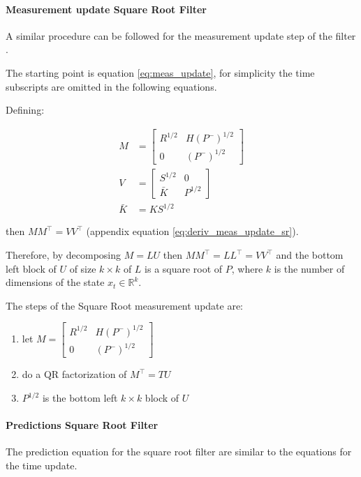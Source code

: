\documentclass{article}
\begin{document}
\paragraph{Measurement update Square Root Filter} A similar procedure can be followed for the measurement update step of the filter \cite{dan_simon_optimal_2006}.

The starting point is equation \ref{eq:meas_update}, for simplicity the time subscripts are omitted in the following equations.

Defining:

\begin{align*}
    M &= \begin{bmatrix} R^{1/2} & H(P^-)^{1/2} \\ 0 & (P^-)^{1/2} \end{bmatrix} \\
    V &= \begin{bmatrix} S^{1/2} & 0 \\ \bar{K} & P^{1/2} \end{bmatrix} \\
    \bar{K} &= KS^{1/2}
\end{align*}
    
then $MM^\top = VV^\top$ (appendix equation \ref{eq:deriv_meas_update_sr}).

Therefore, by decomposing $M=LU$ then $MM^\top=LL^\top=VV^\top$ and the bottom left block of $U$ of size $k \times k$ of $L$ is a square root of $P$, where $k$ is the number of dimensions of the state $x_t \in \mathbb{R}^k$.

The steps of the Square Root measurement update are:
\begin{enumerate}
 \item let $M = \begin{bmatrix} R^{1/2} & H(P^-)^{1/2} \\ 0 & (P^-)^{1/2} \end{bmatrix}$
 \item do a QR factorization of $M^\top=TU$
 \item $P^{1/2}$ is the bottom left $k \times k$ block of $U$
\end{enumerate}

\paragraph{Predictions Square Root Filter} The prediction equation for the square root filter are similar to the equations for the time update.
\end{document}
